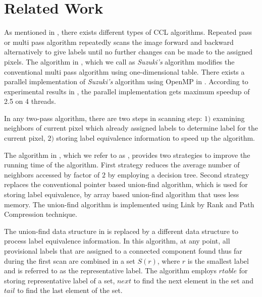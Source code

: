 \section{Related Work}
\label{sec:related_works}

As mentioned in \cite{Suzuki2003_Linear}, there exists different types of CCL
algorithms. Repeated pass or multi pass algorithm repeatedly scans the image
forward and backward alternatively to give labels until no further changes can
be made to the assigned pixels\cite{Haralick1981_Repeated}. The algorithm in
\cite{Suzuki2003_Linear}, which we call as {\em Suzuki's} algorithm modifies the
conventional multi pass algorithm using one-dimensional table. There exists a
parallel implementation of {\em Suzuki's} algorithm using OpenMP in
\cite{Niknam2010_Parallel}. According to experimental results in
\cite{Niknam2010_Parallel}, the parallel implementation gets maximum speedup of
2.5 on 4 threads.

In any two-pass algorithm, there are two steps in scanning step: $1)$ examining neighbors of current pixel which already
assigned labels to determine label for the current pixel, $2)$ storing label equivalence information to speed up the algorithm. 

The algorithm in \cite{Wu2009_LRPC}, which we refer to as \lrpc, provides two strategies to improve the running time of the algorithm.
First strategy reduces the average number of neighbors accessed by factor of $2$ by employing a decision tree.
Second strategy replaces the conventional pointer based union-find algorithm, which is used for storing label equivalence,
by array based union-find algorithm that uses less memory. The union-find algorithm is implemented using
Link by Rank and Path Compression technique. %

The union-find data structure in \cite{He2008_Run} is replaced by a different data structure to process label equivalence
information. In this algorithm, at any point, all provisional labels that are assigned to a connected 
component found thus far during the first scan are combined in a set $S(r)$, where $r$ is the smallest label and is 
referred to as the representative label. The algorithm employs $rtable$ for storing representative label of a set, $next$ to 
find the next element in the set and $tail$ to find the last element of the set.


